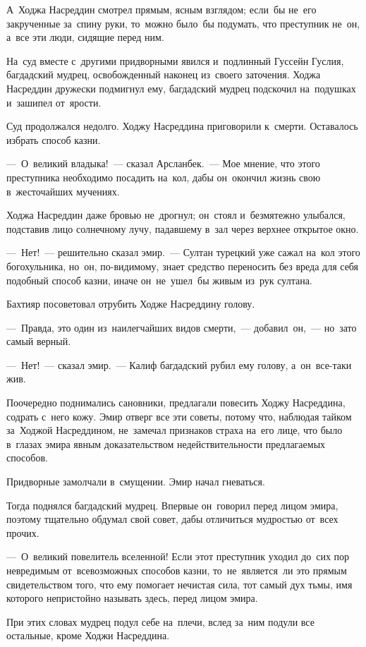 \documentclass[12pt,a4paper]{book}
\begin{document}
А~Ходжа Насреддин смотрел прямым, ясным взглядом; если~бы не~его закрученные за~спину руки, то~можно было~бы подумать, что преступник не~он, а~все эти люди, сидящие перед ним.

На~суд вместе с~другими придворными явился и~подлинный Гуссейн Гуслия, багдадский мудрец, освобожденный наконец из~своего заточения. Ходжа Насреддин дружески подмигнул ему, багдадский мудрец подскочил на~подушках и~зашипел от~ярости.

Суд продолжался недолго. Ходжу Насреддина приговорили к~смерти. Оставалось избрать способ казни.

—~О~великий владыка!~— сказал Арсланбек.~— Мое мнение, что этого преступника необходимо посадить на~кол, дабы он~окончил жизнь свою в~жесточайших мучениях.

Ходжа Насреддин даже бровью не~дрогнул; он~стоял и~безмятежно улыбался, подставив лицо солнечному лучу, падавшему в~зал через верхнее открытое окно.

—~Нет!~— решительно сказал эмир.~— Султан турецкий уже сажал на~кол этого богохульника, но~он, по-видимому, знает средство переносить без вреда для себя подобный способ казни, иначе он~не~ушел~бы живым из~рук султана.

Бахтияр посоветовал отрубить Ходже Насреддину голову.

—~Правда, это один из~наилегчайших видов смерти,~— добавил~он,~— но~зато самый верный.

—~Нет!~— сказал эмир.~— Калиф багдадский рубил ему голову, а~он~все-таки жив.

Поочередно поднимались сановники, предлагали повесить Ходжу Насреддина, содрать с~него кожу. Эмир отверг все эти советы, потому что, наблюдая тайком за~Ходжой Насреддином, не~замечал признаков страха на~его лице, что было в~глазах эмира явным доказательством недействительности предлагаемых способов.

Придворные замолчали в~смущении. Эмир начал гневаться.

Тогда поднялся багдадский мудрец. Впервые он~говорил перед лицом эмира, поэтому тщательно обдумал свой совет, дабы отличиться мудростью от~всех прочих.

—~О~великий повелитель вселенной! Если этот преступник уходил до~сих пор невредимым от~всевозможных способов казни, то~не~является~ли это прямым свидетельством того, что ему помогает нечистая сила, тот самый дух тьмы, имя которого непристойно называть здесь, перед лицом эмира.

При этих словах мудрец подул себе на~плечи, вслед за~ним подули все остальные, кроме Ходжи Насреддина.
\end{document}

